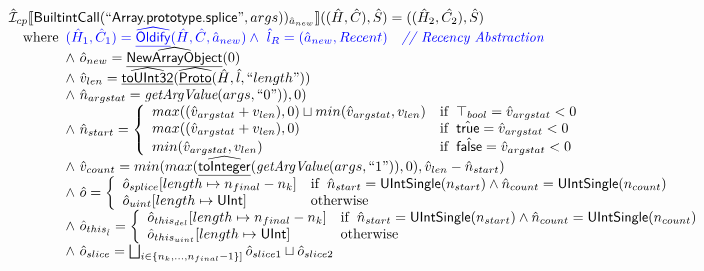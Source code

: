 \[
\begin{array}{l}

\hat{\mathcal{I}} _{cp}\llbracket \mbox{\textsf{BuiltintCall}}(``\mbox{\textsf{Array.prototype.splice}}",args))_{\hat{a}_{new}}\rrbracket((\hat{H},\hat{C}), \hat{S})
  = ((\hat{H}_2, \hat{C_2}), \hat{S})\\
\quad{\rm where}\begin{array}[t]{l}
   \color{blue} (\hat{H}_1, \hat{C}_1) = \widehat{\underline{\sf Oldify}}(\hat{H}, \hat{C}, \hat{a}_{new})
   \land\ \color{blue}\hat{l}_{R} = (\hat{a}_{new}, Recent)
     \quad\textit{{\color{blue}// Recency Abstraction}}\\
  \land\ \hat{o}_{new} = \widehat{\underline{\sf NewArrayObject}}(0)\\
  \land\ \hat{v}_{len} = \widehat{\underline{\sf toUInt32}}(\widehat{\underline{\sf Proto}}(\hat{H}, \hat{l}, ``length"))\\
  \land\ \hat{n}_{argstat} = \emph{getArgValue}(args, ``0")), 0)\\
  \land\ \hat{n}_{start} = \left\{\begin{array}{ll}
      max((\hat{v}_{argstat}+{v}_{len}), 0) \sqcup  min(\hat{v}_{argstat},{v}_{len}) & {\rm if}\begin{array}[t]{l} \top_{bool} = \hat{v}_{argstat} < 0\end{array}\\
      max((\hat{v}_{argstat}+{v}_{len}), 0) & {\rm if}\begin{array}[t]{l} \hat{\mbox{\textsf{true}}} = \hat{v}_{argstat} < 0\end{array}\\
      min(\hat{v}_{argstat},{v}_{len}) & {\rm if}\begin{array}[t]{l} \hat{\mbox{\textsf{false}}} = \hat{v}_{argstat} < 0\end{array}\\
    \end{array}\right.\\ 
  \land\ \hat{v}_{count} = min(max(\widehat{\underline{\sf toInteger}}(\emph{getArgValue}(args, ``1")), 0), \hat{v}_{len} -\hat{n}_{start}) \\
  \land\ \hat{o} = \left\{\begin{array}{ll}
      \hat{o}_{splice}[length \mapsto n_{final} - n_{k}] & {\rm if}\begin{array}[t]{l}\hat{n}_{start} = \mbox{\textsf{UIntSingle}}(n_{start}) \land \hat{n}_{count} = \mbox{\textsf{UIntSingle}}(n_{count})\end{array}\\
      \hat{o}_{uint}[length \mapsto \mbox{\textsf{UInt}}] & {\rm otherwise}
    \end{array}\right.\\
  \land\ \hat{o}_{this_{\hat{l}}} = \left\{\begin{array}{ll}
      \hat{o}_{this_{del}}[length \mapsto n_{final} - n_{k}] & {\rm if}\begin{array}[t]{l}\hat{n}_{start} = \mbox{\textsf{UIntSingle}}(n_{start}) \land \hat{n}_{count} = \mbox{\textsf{UIntSingle}}(n_{count})\end{array}\\
      \hat{o}_{this_{uint}}[length \mapsto \mbox{\textsf{UInt}}] & {\rm otherwise}
    \end{array}\right.\\
  \land\ \hat{o}_{slice} = \bigsqcup_{i \in \{n_{k}, ..., n_{final} -1\}]}\hat{o}_{slice1} \sqcup \hat{o}_{slice2}\\
\end{array}
\end{array}\]
